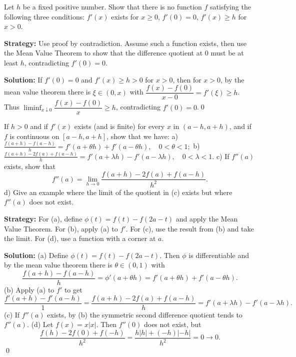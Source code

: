 \begin{problembox}
Let \( h \) be a fixed positive number. Show that there is no function \( f \) satisfying the following three conditions: \( f'(x) \) exists for \( x \geq 0 \), \( f'(0) = 0 \), \( f'(x) \geq h \) for \( x > 0 \).
\end{problembox}

\noindent\textbf{Strategy:} Use proof by contradiction. Assume such a function exists, then use the Mean Value Theorem to show that the difference quotient at 0 must be at least \( h \), contradicting \( f'(0) = 0 \).

\bigskip\noindent\textbf{Solution:}
If $f'(0)=0$ and $f'(x)\ge h>0$ for $x>0$, then for $x>0$, by the mean value theorem there is $\xi\in(0,x)$ with $\dfrac{f(x)-f(0)}{x-0}=f'(\xi)\ge h$. Thus $\liminf_{x\downarrow 0}\dfrac{f(x)-f(0)}{x}\ge h$, contradicting $f'(0)=0$.\qed


\begin{problembox}
If \( h > 0 \) and if \( f'(x) \) exists (and is finite) for every \( x \) in \( (a - h, a + h) \), and if \( f \) is continuous on \( [a - h, a + h] \), show that we have:
a) \( \frac{f(a + h) - f(a - h)}{h} = f'(a + \theta h) + f'(a - \theta h), \quad 0 < \theta < 1; \)
b) \( \frac{f(a + h) - 2f(a) + f(a - h)}{h} = f'(a + \lambda h) - f'(a - \lambda h), \quad 0 < \lambda < 1. \)
c) If \( f''(a) \) exists, show that
\[ f''(a) = \lim_{h \to 0} \frac{f(a + h) - 2f(a) + f(a - h)}{h^2}. \]
d) Give an example where the limit of the quotient in (c) exists but where \( f''(a) \) does not exist.
\end{problembox}

\noindent\textbf{Strategy:} For (a), define \( \phi(t) = f(t) - f(2a - t) \) and apply the Mean Value Theorem. For (b), apply (a) to \( f' \). For (c), use the result from (b) and take the limit. For (d), use a function with a corner at \( a \).

\bigskip\noindent\textbf{Solution:}
(a) Define $\phi(t)=f(t)-f(2a-t)$. Then $\phi$ is differentiable and by the mean value theorem there is $\theta\in(0,1)$ with
\[\frac{f(a+h)-f(a-h)}{h}=\phi'(a+\theta h)=f'(a+\theta h)+f'(a-\theta h).\]
(b) Apply (a) to $f'$ to get
\[\frac{f'(a+h)-f'(a-h)}{1}=\frac{f(a+h)-2f(a)+f(a-h)}{h}=f'(a+\lambda h)-f'(a-\lambda h).\]
(c) If $f''(a)$ exists, by (b) the symmetric second difference quotient tends to $f''(a)$. (d) Let $f(x)=x|x|$. Then $f''(0)$ does not exist, but
\[\frac{f(h)-2f(0)+f(-h)}{h^2}=\frac{h|h|+(-h)|-h|}{h^2}=0\to 0.\]\qed


